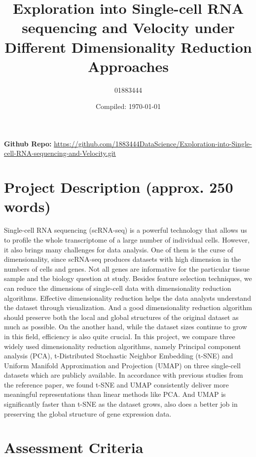 \documentclass[a4paper, 12pt]{article}
\title{Exploration into Single-cell RNA sequencing and Velocity under Different Dimensionality Reduction Approaches}
\author{01883444}
\date{Compiled: \today}
\begin{document}
\maketitle

\textbf{Github Repo:} \href{https://github.com/zakvarty/eds-notes-quarto/releases/tag/v1.2.0-alpha}{https://github.com/1883444DataScience/Exploration-into-Single-cell-RNA-sequencing-and-Velocity.git}

\section{Project Description (approx. 250 words)}

Single-cell RNA sequencing (scRNA-seq) is a powerful technology that allows us to profile the whole transcriptome of a large number of individual cells. 
However, it also brings many challenges for data analysis.
One of them is the curse of dimensionality, since scRNA-seq produces datasets with high dimension in the numbers of cells and genes. 
Not all genes are informative for the particular tissue sample and the biology question at study.
Besides feature selection techniques, we can reduce the dimensions of single-cell data with dimensionality reduction algorithms.
Effective dimensionality reduction helps the data analysts understand the dataset through visualization.
And a good dimensionality reduction algorithm should preserve both the local and global structures of the original dataset as much as possible. 
On the another hand, while the dataset sizes continue to grow in this field, efficiency is also quite crucial.
In this project, we compare three widely used dimensionality reduction algorithms, namely Principal component analysis (PCA), t-Distributed Stochastic Neighbor Embedding (t-SNE) and Uniform Manifold Approximation and Projection (UMAP) on three single-cell datasets which are publicly available.
In accordance with previous studies from the reference paper, we found t-SNE and UMAP consistently deliver more meaningful representations than linear methods like PCA. 
And UMAP is significantly faster than t-SNE as the dataset grows, also does a better job in preserving the global structure of gene expression data.






\pagebreak

\section{Assessment Criteria}
\end{document}

